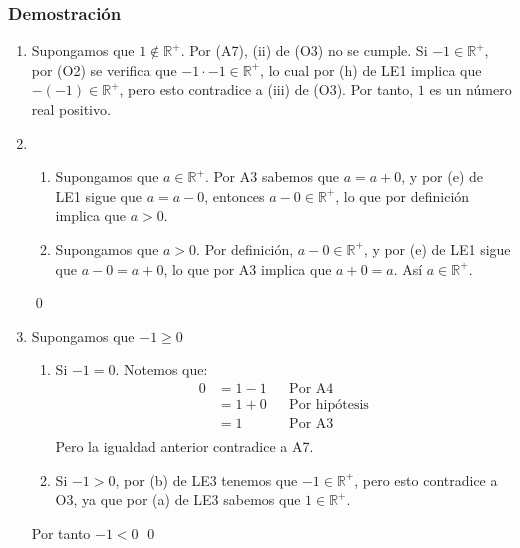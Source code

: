 \documentclass[11pt]{article}
\begin{document}
\subsubsection*{Demostración}

\begin{enumerate}[label=\alph*),font=\bfseries]


    \item Supongamos que $1 \notin \mathbb{R}^+$. Por (A7), (ii) de (O3) no se cumple. Si $-1 \in \mathbb{R}^+$, por (O2) se verifica que $-1 \cdot -1 \in \mathbb{R}^+$, lo cual por (h) de LE1 implica que $-(-1) \in \mathbb{R}^+$, pero esto contradice a (iii) de (O3). Por tanto, $1$ es un número real positivo.


    \item \begin{enumerate}[label=\roman*),font=\bfseries]
        \item Supongamos que $a \in \mathbb{R}^+$. Por A3 sabemos que $a=a+0$, y por (e) de LE1 sigue que $a=a-0$, entonces $a-0 \in \mathbb{R}^+$, lo que por definición implica que $a>0$.
        \item Supongamos que $a>0$. Por definición, $a-0 \in \mathbb{R}^+$, y por (e) de LE1 sigue que $a-0=a+0$, lo que por A3 implica que $a+0=a$. Así $a \in \mathbb{R}^+$.
        \end{enumerate}
    \qed


    \item Supongamos que $-1 \geq 0$
    \begin{enumerate}[label=\roman*),font=\bfseries]
        \item Si $-1=0$. Notemos que:
        \begin{align*}
        0 &= 1 - 1 && \text{Por A4}\\
        &= 1 + 0 && \text{Por hipótesis}\\
        &= 1 && \text{Por A3}\\
        \end{align*}
        Pero la igualdad anterior contradice a A7.
        \item Si $-1 > 0$, por (b) de LE3 tenemos que $-1 \in \mathbb{R}^+$, pero esto contradice a O3, ya que por (a) de LE3 sabemos que $1 \in \mathbb{R}^+$.
    \end{enumerate}
    Por tanto $-1<0$
    \qed



\end{enumerate}
\end{document}
